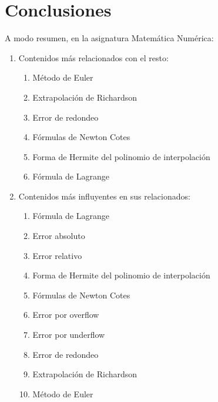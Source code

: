 \documentclass[a4paper,10pt,twocolumn]{article}
\begin{document}
        



        \newpage

\section{Conclusiones}\label{sec:conc}

  A modo resumen, en la asignatura Matemática Numérica:
    \begin{enumerate}
        
        \item Contenidos más relacionados con el resto:
        \begin{enumerate}
            \item Método de Euler
            \item Extrapolación de Richardson
            \item Error de redondeo
            \item Fórmulas de Newton Cotes
            \item Forma de Hermite del polinomio de interpolación
            \item Fórmula de Lagrange
        \end{enumerate}
        
        \item Contenidos más influyentes en sus relacionados:
        \begin{enumerate}
            \item Fórmula de Lagrange
            \item Error absoluto
            \item Error relativo
            \item Forma de Hermite del polinomio de interpolación
            \item Fórmulas de Newton Cotes
            \item Error por overflow
            \item Error por underflow
            \item Error de redondeo
            \item Extrapolación de Richardson
            \item Método de Euler
        \end{enumerate}
        

\end{enumerate}
\end{document}
